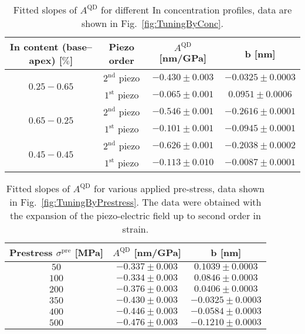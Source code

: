  		\begin{table}[ht!]
 			\centering
 			\caption{Fitted slopes of $A^{\mathrm{QD}}$ for different In concentration profiles, data are shown in Fig.~\ref{fig:TuningByConc}.}
 				\label{tab:conc_slopes}
 				\begin{tabular}{|c|c|c|c|}
 					\hline
 		In content (base--apex)	[$\%$]	& Piezo order	& $A^{\mathrm{QD}}$ [nm/GPa]    & b   [nm]    \\ \hline
 					\multirow{2}{*}{$0.25-0.65$} & $2^\mathrm{nd}$ piezo &$-0.430 \pm 0.003$  & $-0.0325 \pm 0.0003$      \\ \cline{2-4}
 			&	$1^\mathrm{st}$ piezo 	& $-0.065 \pm 0.001$  & $0.0951 \pm 0.0006$      \\ \hline
 			\multirow{2}{*}{$0.65-0.25$} & $2^\mathrm{nd}$ piezo &$-0.546 \pm 0.001$  & $-0.2616 \pm 0.0001$      \\ \cline{2-4}
 			&	$1^\mathrm{st}$ piezo 	& $-0.101 \pm 0.001$  & $-0.0945 \pm 0.0001$      \\ \hline
 			\multirow{2}{*}{$0.45-0.45$} & $2^\mathrm{nd}$ piezo &$-0.626 \pm 0.001$  & $-0.2038 \pm 0.0002$      \\ \cline{2-4}
 			&	$1^\mathrm{st}$ piezo 	& $-0.113 \pm 0.010$  & $-0.0087 \pm 0.0001 $     \\ \hline
 				\end{tabular}    
 			\end{table}
 			

 		\begin{table}[ht!]
 			\centering
 			\caption{Fitted slopes of $A^{\mathrm{QD}}$ for various applied pre-stress, data shown in Fig.~\ref{fig:TuningByPrestress}. The data were obtained with the expansion of the piezo-electric field up to second order in strain.}
 			\label{tab:prestress_slopes}
 			\begin{tabular}{|c|c|c|}
 				\hline
 				Prestress $\sigma^\mathrm{pre}$ [MPa]		& $A^{\mathrm{QD}}$ [nm/GPa]    & b   [nm]    \\ \hline
 				$50$  &$-0.337 \pm 0.003$  & $0.1039 \pm 0.0003 $    \\ \hline
 				$100$	&$-0.334 \pm 0.003$  & $0.0846 \pm 0.0003 $     \\ \hline
 				$200$  &$-0.376 \pm 0.003$  & $0.0406\pm 0.0003 $    \\ \hline
 				$350$	&$-0.430 \pm 0.003$  & $-0.0325 \pm 0.0003$      \\ \hline
 				$400$  &$-0.446 \pm 0.003$  & $-0.0584 \pm 0.0003$    \\ \hline
 				$500$	&$-0.476 \pm 0.003$  & $-0.1210 \pm 0.0003$      \\ \hline
 			\end{tabular}    
 		\end{table}


